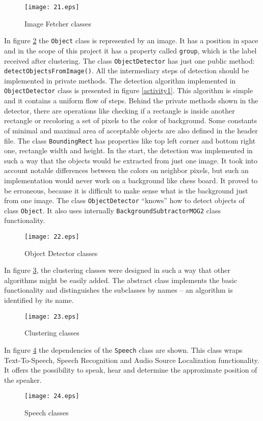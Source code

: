         \begin{figure}[h!]
            \centering
            \texttt{[image: 21.eps]} 
            \caption{Image Fetcher classes}
            \label{image}
        \end{figure}
        In figure \ref{detector} the \verb|Object| class is represented by an image. It has a position in space and in the scope of this project it has a property called \verb|group|, which is the label received after clustering. The class \verb|ObjectDetector| has just one public method: \verb|detectObjectsFromImage()|. All the intermediary steps of detection should be implemented in private methods. The detection algorithm implemented in \verb|ObjectDetector| class is presented in figure \ref{activity1}. This algorithm is simple and it contains a uniform flow of steps. Behind the private methods shown in the detector, there are operations like checking if a rectangle is inside another rectangle or recoloring a set of pixels to the color of background. Some constants of minimal and maximal area of acceptable objects are also defined in the header file. The class \verb|BoundingRect| has properties like top left corner and bottom right one, rectangle width and height. In the start, the detection was implemented in such a way that the objects would be extracted from just one image. It took into account notable differences between the colors on neighbor pixels, but such an implementation would never work on a background like chess board. It proved to be erroneous, because it is difficult to make sense what is the background just from one image. The class \verb|ObjectDetector| ``knows'' how to detect objects of class \verb|Object|. It also uses internally \verb|BackgroundSubtractorMOG2| class functionality.

        \begin{figure}[h!]
            \centering
            \texttt{[image: 22.eps]} 
            \caption{Object Detector classes}
            \label{detector}
        \end{figure}
        In figure \ref{cluster}, the clustering classes were designed in such a way that other algorithms might be easily added. The abstract class implements the basic functionality and distinguishes the subclasses by names -- an algorithm is identified by its name. 
        \begin{figure}[t!]
            \centering
            \texttt{[image: 23.eps]} 
            \caption{Clustering classes}
            \label{cluster}
        \end{figure}
        In figure \ref{speech} the dependencies of the \verb|Speech| class are shown. This class wraps Text-To-Speech, Speech Recognition and Audio Source Localization functionality. It offers the possibility to speak, hear and determine the approximate position of the speaker.
        \begin{figure}[b!]
            \centering
            \texttt{[image: 24.eps]} 
            \caption{Speech classes}
            \label{speech}
        \end{figure}

